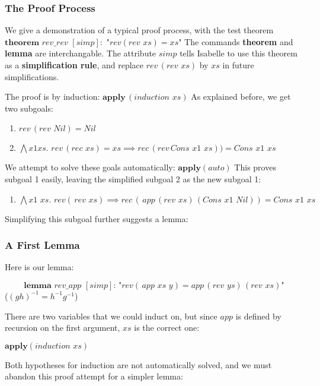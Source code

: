 \documentclass{article}
\newcommand{\qq}{\texttt{"}}
\begin{document}
\subsubsection{The Proof Process}

We give a demonstration of a typical proof process, with the test theorem
$\textbf{theorem}\,\,rev\_rev\,\,[simp]:\,\,\qq rev(rev\,\,xs) = xs\qq $
The commands \textbf{theorem} and \textbf{lemma} are interchangable. 
The attribute $simp$ tells Isabelle to use this theorem as a 
\textbf{simplification rule}, and replace $rev\,(rev\,\,xs)$ by $xs$ 
in future simplifications.

The proof is by induction:
$\textbf{apply}\,(induction\,\,xs)$
As explained before, we get two subgoals:

\begin{enumerate}
\item $rev\,(rev\,\,Nil) = Nil$
\item $\bigwedge x1 xs.\,\,rev\,(rec\,\,xs)=xs \implies rec\,(rev\,Cons\,\,x1\,\,xs)) = Cons\,\,x1\,\,xs$
\end{enumerate}

We attempt to solve these goals automatically:
$\textbf{apply}(auto)$
This proves subgoal 1 easily, leaving the simplified subgoal 2 as the 
new subgoal 1:

\begin{enumerate}
\item $\bigwedge x1\,\,xs. \,\,rev(\,rev\,\,xs) \implies rec\,(\,app\,(rev\,\,xs)\,(Cons\,\,x1\,\,Nil)) = Cons\,\,x1\,\,xs$
\end{enumerate}

Simplifying this subgoal further suggests a lemma:

\subsubsection*{A First Lemma}

Here is our lemma:

$$\textbf{lemma}\,\,rev\_app\,\,[simp]:\,\qq rev(\,app\,\,xs\,\,y)=app\,(rev\,\,ys)\,(rev\,\,xs)\qq $$
($(gh)^{-1} = h^{-1}g^{-1}$)

There are two variables that we could induct on, but since $app$ is 
defined by recursion on the first argument, $xs$ is the correct one:

$\textbf{apply}(induction\,\,xs)$

Both hypotheses for induction are not automatically solved, and we 
must abandon this proof attempt for a simpler lemma:
\end{document}
